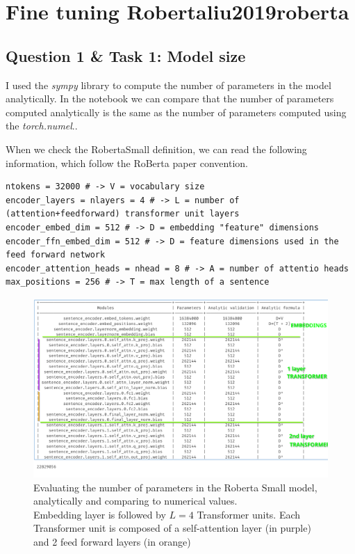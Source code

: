 \documentclass[a4paper]{article}
\begin{document}

\section{Fine tuning Roberta{liu2019roberta}}
\subsection*{Question 1 \& Task 1: Model size}
I used the \textit{sympy} library to compute the number of parameters in the model analytically.
In the notebook we can compare that the number of parameters computed analytically is the same as the number of parameters computed using the \textit{torch.numel}..


When we check the RobertaSmall definition, we can read the following information, which follow the RoBerta\cite{liu2019roberta} paper convention.
\begin{verbatim}
ntokens = 32000 # -> V = vocabulary size
encoder_layers = nlayers = 4 # -> L = number of (attention+feedforward) transformer unit layers
encoder_embed_dim = 512 # -> D = embedding "feature" dimensions
encoder_ffn_embed_dim = 512 # -> D = feature dimensions used in the feed forward network
encoder_attention_heads = nhead = 8 # -> A = number of attentio heads
max_positions = 256 # -> T = max length of a sentence
\end{verbatim}


\begin{figure}[ht]
    \centering
    \includegraphics[width=.6\textwidth]{figures/roberta_params.png}
    \caption{Evaluating the number of parameters in the Roberta Small model, analytically and comparing to numerical values. \\ 
    Embedding layer is followed by $L=4$ Transformer units. Each Transformer unit is composed of a self-attention layer (in purple) and 2 feed forward layers (in orange)}
    \label{fig:roberta_params}
\end{figure}
\end{document}
